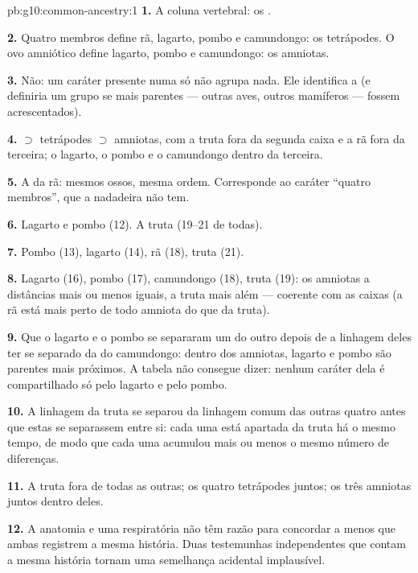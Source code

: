 \begin{solution}{pb:g10:common-ancestry:1}
\textbf{1.} A coluna vertebral: os .

\textbf{2.} Quatro membros define rã, lagarto, pombo e camundongo: os
tetrápodes. O ovo amniótico define lagarto, pombo e camundongo: os
amniotas.

\textbf{3.} Não: um caráter presente numa só  não agrupa nada.
Ele identifica a  (e definiria um grupo se mais parentes ---
outras aves, outros mamíferos --- fossem acrescentados).

\textbf{4.}  $\supset$ tetrápodes $\supset$ amniotas, com a
truta fora da segunda caixa e a rã fora da terceira; o lagarto, o pombo
e o camundongo dentro da terceira.

\textbf{5.} A da rã: mesmos ossos, mesma ordem. Corresponde ao caráter
``quatro membros'', que a nadadeira não tem.

\textbf{6.} Lagarto e pombo (12). A truta (19--21 de todas).

\textbf{7.} Pombo (13), lagarto (14), rã (18), truta (21).

\textbf{8.} Lagarto (16), pombo (17), camundongo (18), truta (19): os
amniotas a distâncias mais ou menos iguais, a truta mais além ---
coerente com as caixas (a rã está mais perto de todo amniota do que da
truta).

\textbf{9.} Que o lagarto e o pombo se separaram um do outro depois de
a linhagem deles ter se separado da do camundongo: dentro dos
amniotas, lagarto e pombo são parentes mais próximos. A tabela não
consegue dizer: nenhum caráter dela é compartilhado só pelo lagarto e
pelo pombo.

\textbf{10.} A linhagem da truta se separou da linhagem comum das
outras quatro antes que estas se separassem entre si: cada uma está
apartada da truta há o mesmo tempo, de modo que cada uma acumulou mais
ou menos o mesmo número de diferenças.

\textbf{11.} A truta fora de todas as outras; os quatro tetrápodes
juntos; os três amniotas juntos dentro deles.

\textbf{12.} A anatomia e uma  respiratória não têm razão para
concordar a menos que ambas registrem a mesma história. Duas
testemunhas independentes que contam a mesma história tornam uma
semelhança acidental implausível.


\end{solution}
